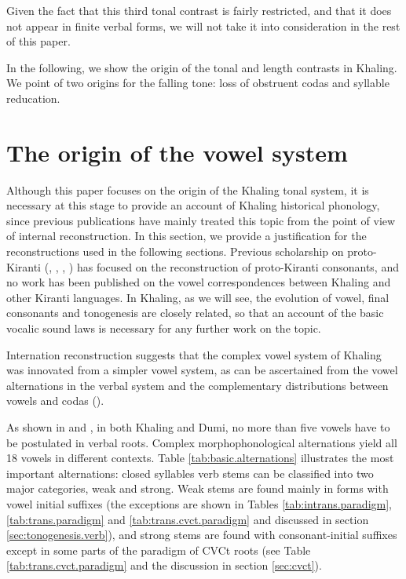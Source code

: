\documentclass[oldfontcommands,oneside,a4paper,11pt]{article}
\begin{document}
Given the fact that this third tonal contrast is fairly restricted, and that it does not appear in finite verbal forms, we will not take it into consideration in the rest of this paper.


In the following, we show the origin of the tonal and length contrasts in Khaling. We point of two origins for the falling tone: loss of obstruent codas and syllable reducation.

\section{The origin of the vowel system}
Although this paper focuses on the origin of the Khaling tonal system, it is necessary at this stage to provide an account of Khaling historical phonology, since previous publications have mainly treated this topic from the point of view of internal reconstruction. In this section, we provide a justification for the reconstructions used in the following sections. Previous scholarship on proto-Kiranti (\citealt{driem90r}, \citealt{michailovsky94stops}, \citealt{starostin94kiranti}, \citealt{opgenort05jero}) has focused on the reconstruction of proto-Kiranti consonants, and no work has been published on the vowel correspondences between Khaling and other Kiranti languages. In Khaling, as we will see, the evolution of vowel, final consonants and tonogenesis are closely related, so that an account of the basic vocalic sound laws is necessary for any further work on the topic.

Internation reconstruction suggests that the complex vowel system of Khaling was innovated from a simpler   vowel system, as can be ascertained from the vowel alternations in the verbal system and the complementary distributions between vowels and codas (\citealt{jacques12khaling}). 

As shown in \citet{jacques12khaling} and \citet{michailovsky12dumi}, in both Khaling and Dumi, no more than five vowels have to be postulated in verbal roots. Complex morphophonological alternations yield all 18 vowels in different contexts. Table \ref{tab:basic.alternations} illustrates  the most important alternations: closed syllables verb stems can be classified into two major categories, weak and strong. Weak stems are found mainly in forms with vowel initial suffixes (the exceptions are shown in Tables \ref{tab:intrans.paradigm}, \ref{tab:trans.paradigm} and \ref{tab:trans.cvct.paradigm} and discussed in section \ref{sec:tonogenesis.verb}), and strong stems are   found with consonant-initial suffixes except in some parts of the paradigm of CVCt roots (see Table \ref{tab:trans.cvct.paradigm} and the discussion in section \ref{sec:cvct}).
\end{document}
